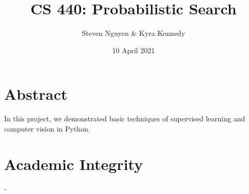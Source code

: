 \documentclass[12pt]{report}
\title{CS 440: Probabilistic Search}
\author{Steven Nguyen \& Kyra Kennedy}
\date{10 April 2021}
\begin{document}
\begin{titlepage}
\maketitle
\end{titlepage}

\section*{Abstract}
In this project, we demonstrated basic techniques of supervised learning and computer vision in Python.

\section*{Academic Integrity}
-
\end{document}
